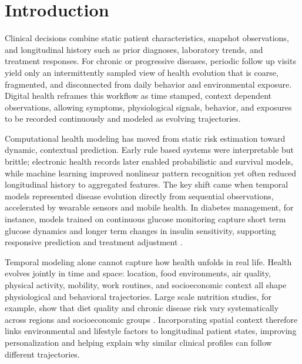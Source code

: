 \documentclass[journal]{IEEEtran}
\providecommand{\Description}[1]{}
\begin{document}



\section{Introduction}
Clinical decisions combine static patient characteristics, snapshot observations, and longitudinal history such as prior diagnoses, laboratory trends, and treatment responses. For chronic or progressive diseases, periodic follow up visits yield only an intermittently sampled view of health evolution that is coarse, fragmented, and disconnected from daily behavior and environmental exposure. Digital health reframes this workflow as time stamped, context dependent observations, allowing symptoms, physiological signals, behavior, and exposures to be recorded continuously and modeled as evolving trajectories.

Computational health modeling has moved from static risk estimation toward dynamic, contextual prediction. Early rule based systems were interpretable but brittle; electronic health records later enabled probabilistic and survival models, while machine learning improved nonlinear pattern recognition yet often reduced longitudinal history to aggregated features. The key shift came when temporal models represented disease evolution directly from sequential observations, accelerated by wearable sensors and mobile health. In diabetes management, for instance, models trained on continuous glucose monitoring capture short term glucose dynamics and longer term changes in insulin sensitivity, supporting responsive prediction and treatment adjustment \cite{Vaughan2025CGMPrediction,Gecili2020CGMPrediction}.

Temporal modeling alone cannot capture how health unfolds in real life. Health evolves jointly in time and space: location, food environments, air quality, physical activity, mobility, work routines, and socioeconomic context all shape physiological and behavioral trajectories. Large scale nutrition studies, for example, show that diet quality and chronic disease risk vary systematically across regions and socioeconomic groups \cite{McCullough2022Diet}. Incorporating spatial context therefore links environmental and lifestyle factors to longitudinal patient states, improving personalization and helping explain why similar clinical profiles can follow different trajectories.
\end{document}
